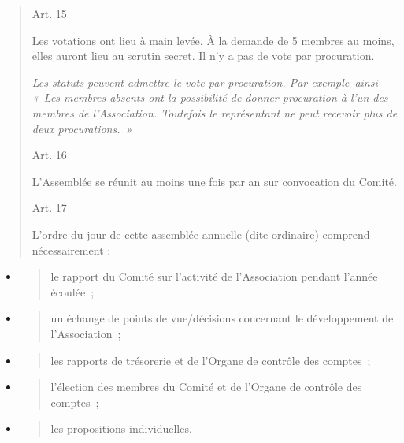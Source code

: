\documentclass[
]{article}
\begin{document}
\begin{quote}
Art. 15

Les votations ont lieu à main levée. À la demande de 5 membres au moins,
elles auront lieu au scrutin secret. Il n'y a pas de vote par
procuration.

\emph{Les statuts peuvent admettre le vote par procuration. Par
exemple~ainsi «~Les membres absents ont la possibilité de donner
procuration à l'un des membres de l'Association. Toutefois le
représentant ne peut recevoir plus de deux procurations.~»}

Art. 16

L'Assemblée se réunit au moins une fois par an sur convocation du
Comité.

Art. 17

L'ordre du jour de cette assemblée annuelle (dite ordinaire) comprend
nécessairement :
\end{quote}

\begin{itemize}
\item
  \begin{quote}
  le rapport du Comité sur l'activité de l'Association pendant l'année
  écoulée~;
  \end{quote}
\item
  \begin{quote}
  un échange de points de vue/décisions concernant le développement de
  l'Association~;
  \end{quote}
\item
  \begin{quote}
  les rapports de trésorerie et de l'Organe de contrôle des comptes~;
  \end{quote}
\item
  \begin{quote}
  l'élection des membres du Comité et de l'Organe de contrôle des
  comptes~;
  \end{quote}
\item
  \begin{quote}
  les propositions individuelles.
  \end{quote}
\end{itemize}
\end{document}
